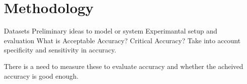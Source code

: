 \chapter{Methodology}
Datasets
Preliminary ideas to model or system
Experimantal setup and evaluation
What is Acceptable Accuracy?
Critical Accuracy?
Take into account specificity and sensitivity in accuracy. 

There is a need to measure these to evaluate accuracy and whether the acheived accuracy is good enough.